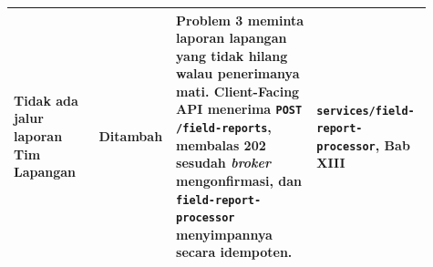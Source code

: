 \begin{longtable}[]{|>{\raggedright\arraybackslash}p{0.2\linewidth}|>{\raggedright\arraybackslash}p{0.11\linewidth}|>{\raggedright\arraybackslash}p{0.33\linewidth}|>{\raggedright\arraybackslash}p{0.27\linewidth}|}
\hline
Tidak ada jalur laporan Tim Lapangan & Ditambah & Problem 3 meminta laporan lapangan yang tidak hilang walau penerimanya mati. Client-Facing API menerima \texttt{POST /field-reports}, membalas 202 sesudah \textit{broker} mengonfirmasi, dan \texttt{field-report-processor} menyimpannya secara idempoten. & \texttt{services/field-report-processor}, Bab XIII \\
\hline
\end{longtable}

